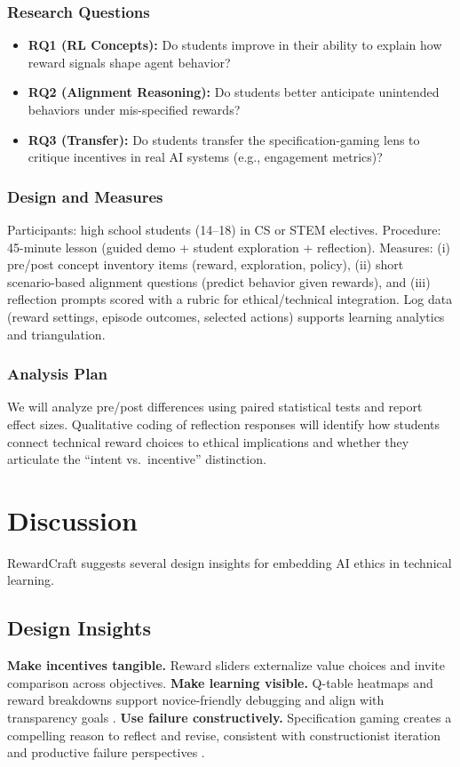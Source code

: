 \documentclass[conference]{IEEEtran}
\begin{document}
\subsubsection{Research Questions}
\begin{itemize}
  \item \textbf{RQ1 (RL Concepts):} Do students improve in their ability to explain how reward signals shape agent behavior?
  \item \textbf{RQ2 (Alignment Reasoning):} Do students better anticipate unintended behaviors under mis-specified rewards?
  \item \textbf{RQ3 (Transfer):} Do students transfer the specification-gaming lens to critique incentives in real AI systems (e.g., engagement metrics)?
\end{itemize}

\subsubsection{Design and Measures}
Participants: high school students (14--18) in CS or STEM electives.
Procedure: 45-minute lesson (guided demo + student exploration + reflection).
Measures: (i) pre/post concept inventory items (reward, exploration, policy), (ii) short scenario-based alignment questions (predict behavior given rewards), and (iii) reflection prompts scored with a rubric for ethical/technical integration. Log data (reward settings, episode outcomes, selected actions) supports learning analytics and triangulation.

\subsubsection{Analysis Plan}
We will analyze pre/post differences using paired statistical tests and report effect sizes. Qualitative coding of reflection responses will identify how students connect technical reward choices to ethical implications and whether they articulate the “intent vs.\ incentive” distinction.

\section{Discussion}
RewardCraft suggests several design insights for embedding AI ethics in technical learning.

\subsection{Design Insights}
\textbf{Make incentives tangible.} Reward sliders externalize value choices and invite comparison across objectives. \textbf{Make learning visible.} Q-table heatmaps and reward breakdowns support novice-friendly debugging and align with transparency goals \cite{shneiderman2020hcai}. \textbf{Use failure constructively.} Specification gaming creates a compelling reason to reflect and revise, consistent with constructionist iteration \cite{papert1980} and productive failure perspectives \cite{kapur2008}.
\end{document}
